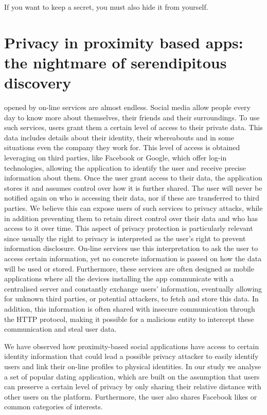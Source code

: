 \begin{savequote}[75mm]
If you want to keep a secret, you must also hide it from yourself.
\end{savequote}

\chapter{Privacy in proximity based apps: the nightmare of serendipitous discovery}

 opened by on-line services are almost endless. Social media allow people every day to know more about themselves, their friends and their surroundings. To use such services, users grant them a certain level of access to their private data. This data includes details about their identity, their whereabouts and in some situations even the company they work for. This level of access is obtained leveraging on third parties, like Facebook or Google, which offer log-in technologies, allowing the application to identify the user and receive precise information about them.
Once the user grant access to their data, the application stores it and assumes control over how it is further shared. The user will never be notified again on who is accessing their data, nor if these are transferred to third parties.
We believe this can expose users of such services to privacy attacks, while in addition preventing them to retain direct control over their data and who has access to it over time.
This aspect of privacy protection is particularly relevant since usually the right to privacy is interpreted as the user's right to prevent information disclosure. On-line services use this interpretation to ask the user to access certain information, yet no concrete information is passed on how the data will be used or stored. Furthermore, these services are often designed as mobile applications where all the devices installing the app communicate with a centralised server and constantly exchange users' information, eventually allowing for unknown third parties, or potential attackers, to fetch and store this data. In addition, this information is often shared with insecure communication through the HTTP protocol, making it possible for a malicious entity to intercept these communication and steal user data.

We have observed how proximity-based social applications have access to certain identity information that could lead a possible privacy attacker to easily identify users and link their on-line profiles to physical identities. In our study we analyse a set of popular dating application, which are built on the assumption that users can preserve a certain level of privacy by only sharing their relative distance with other users on the platform. Furthermore, the user also shares Facebook likes or common categories of interests.

